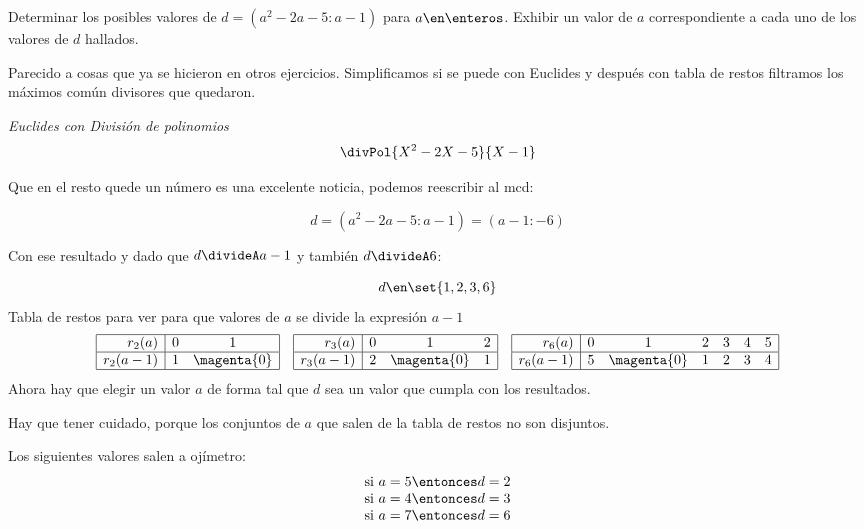 \begin{enunciado}{\ejExtra}
  Determinar los posibles valores de $d = (a^2 - 2a -5: a-1)$ para $a \en \enteros$. Exhibir un valor de $a$
  correspondiente a cada uno de los valores de $d$ hallados.
\end{enunciado}

Parecido a cosas que ya se hicieron en otros ejercicios. Simplificamos si se puede con Euclides y después con tabla de restos
filtramos los máximos común divisores que quedaron.

\bigskip

\textit{Euclides con División de polinomios}
$$
  \divPol{X^2 - 2X -5}{X-1}
$$

Que en el resto quede un número es una excelente noticia, podemos reescribir al mcd:

$$
  d = (a^2 - 2a -5: a-1) = (a-1 : -6)
$$

Con ese resultado y dado que $d  \divideA a - 1$ y también $d\divideA 6$:

$$
  d \en \set{1, 2, 3, 6}
$$
Tabla de restos para ver para que valores de $a$ se divide la expresión $a-1$
$$
  \begin{array}{|r|cc|}
    \hline
    r_2(a)     & 0 & 1           \\ \hline
    r_2(a - 1) & 1 & \magenta{0} \\ \hline
  \end{array}
  \quad
  \begin{array}{|r|ccc|}
    \hline
    r_3(a)     & 0 & 1           & 2 \\ \hline
    r_3(a - 1) & 2 & \magenta{0} & 1 \\ \hline
  \end{array}
  \quad
  \begin{array}{|r|cccccc|}
    \hline
    r_6(a)     & 0 & 1           & 2 & 3 & 4 & 5 \\ \hline
    r_6(a - 1) & 5 & \magenta{0} & 1 & 2 & 3 & 4 \\ \hline
  \end{array}
$$
Ahora hay que elegir un valor $a$ de forma tal que $d$ sea un valor que cumpla con los resultados.

Hay que tener cuidado, porque los conjuntos de $a$ que salen de la tabla de restos no son disjuntos.

Los siguientes valores salen a ojímetro:
$$
  \begin{array}{c}
    \text{si } a = 5 \entonces d = 2 \\
    \text{si } a = 4 \entonces d = 3 \\
    \text{si } a = 7 \entonces d = 6
  \end{array}
$$

\begin{aportes}
  \item {}
\end{aportes}
